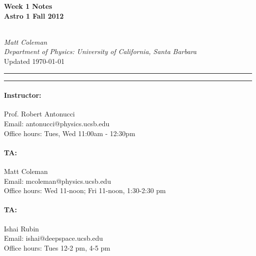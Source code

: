 \documentclass{article}
\begin{document}
\cfoot{\thepage}

\begin{centering}
	
	\begin{large}\textbf{Week 1 Notes\\
	Astro 1 Fall 2012}\end{large}\vspace{7pt}\\
	\textit{Matt Coleman \\
	Department of Physics: University of California, Santa Barbara}\vspace{5pt}\\
	Updated \today\vspace{14pt}
	
\end{centering}	

\hrule\vspace{2pt} \hrule
\paragraph*{Instructor:} Prof. Robert Antonucci\\
Email: antonucci@physics.ucsb.edu\\
Office hours: Tues, Wed 11:00am - 12:30pm

\paragraph*{TA:}Matt Coleman\\
Email: mcoleman@physics.ucsb.edu\\
Office hours: Wed 11-noon; Fri 11-noon, 1:30-2:30 pm\\

\paragraph*{TA:}Ishai Rubin\\
Email: ishai@deepspace.ucsb.edu\\
Office hours: Tues 12-2 pm, 4-5 pm\\


\end{document}
